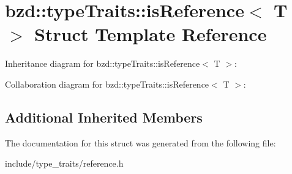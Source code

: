 \hypertarget{structbzd_1_1typeTraits_1_1isReference}{}\section{bzd\+:\+:type\+Traits\+:\+:is\+Reference$<$ T $>$ Struct Template Reference}
\label{structbzd_1_1typeTraits_1_1isReference}


Inheritance diagram for bzd\+:\+:type\+Traits\+:\+:is\+Reference$<$ T $>$\+:


Collaboration diagram for bzd\+:\+:type\+Traits\+:\+:is\+Reference$<$ T $>$\+:
\subsection*{Additional Inherited Members}


The documentation for this struct was generated from the following file\+:\begin{DoxyCompactItemize}
\item 
include/type\+\_\+traits/reference.\+h\end{DoxyCompactItemize}
